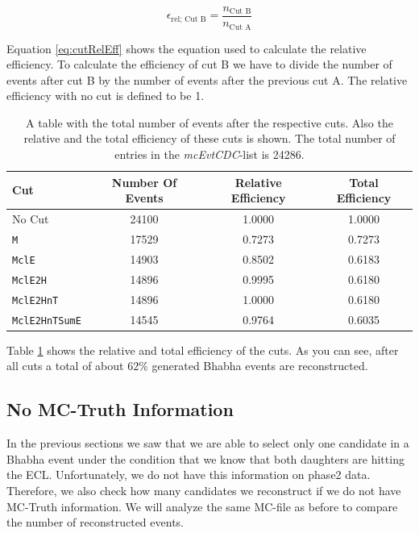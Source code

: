 \documentclass[a4paper,11pt,twosided,final,german,openbib,pdftex,listof=totoc,bibliography=totoc]{scrbook}
\begin{document}
\begin{equation}
	\epsilon_{\textrm{rel; Cut B}} = \frac{n_{\textrm{Cut B}}}{n_{\textrm{Cut A}}}
	\label{eq:cutRelEff}
\end{equation}

Equation \ref{eq:cutRelEff} shows the equation used to calculate the relative efficiency. To calculate the efficiency of cut B we have to divide the number of events after cut B by the number of events after the previous
cut A. The relative efficiency with no cut is defined to be 1.

\begin{table}[h!]
	\centering
\begin{tabular}{lccc}
 Cut& Number Of Events&  Relative Efficiency& Total Efficiency\\
 \hline
 No Cut&24100 &1.0000 &1.0000 \\
 \texttt{M}& 17529&0.7273 &0.7273 \\
 \texttt{MclE}&14903 &0.8502 &0.6183 \\
 \texttt{MclE2H}&14896&0.9995  &0.6180 \\
 \texttt{MclE2HnT}&14896 &1.0000 &0.6180 \\
 \texttt{MclE2HnTSumE}& 14545 &0.9764 &0.6035 \\

\end{tabular}

\caption[Cut Efficiencies]{A table with the total number of events after the respective cuts. Also the relative and the total efficiency of these cuts is shown. The total number of entries in the \textit{mcEvtCDC}-list is 24286.}
\label{tab:cutEff}
\end{table}

Table \ref{tab:cutEff} shows the relative and total efficiency of the cuts.
As you can see, after all cuts a total of about $62\%$ generated Bhabha events are reconstructed. 

\subsection{No MC-Truth Information}
\label{sec:NoMCT}

In the previous sections we saw that we are able to select only one candidate in a Bhabha event under the condition that we know that both daughters are hitting the ECL. Unfortunately, we do not have this information on phase2 data. Therefore, we also check how many candidates we reconstruct if we do not have MC-Truth information. We will analyze the same MC-file as before to compare the number of reconstructed events. 
\end{document}
